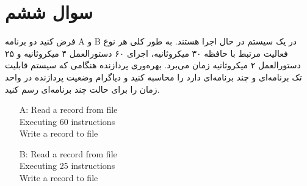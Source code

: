 \section{سوال ششم}

	فرض کنید دو برنامه A و B در یک سیستم در حال اجرا هستند. به طور کلی هر نوع فعالیت مرتبط با حافظه ۳۰ میکروثانیه، اجرای ۶۰ دستورالعمل ۴ میکروثانیه و ۲۵ دستورالعمل ۲ میکروثانیه زمان می‌برد. بهره‌وری پردازنده هنگامی که سیستم قابلیت تک برنامه‌ای و چند برنامه‌ای دارد را محاسبه کنید و دیاگرام وضعیت پردازنده در واحد زمان را برای حالت چند برنامه‌ای رسم کنید.

\begin{latin}
	\begin{enumerate}
		\item [A:] 
		Read a record from file \\
		Executing 60 instructions \\
		Write a record to file
		
		\item [B:]
		Read a record from file \\
		Executing 25 instructions \\
		Write a record to file
	\end{enumerate}
\end{latin}

